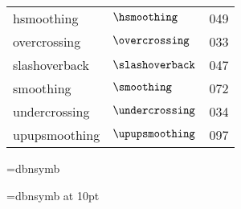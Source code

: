 \documentclass{article}
\begin{document}
\begin{tabular}{lll}
hsmoothing       &  $\hsmoothing   $    &  049\\
overcrossing     &  $\overcrossing $    &  033\\       
slashoverback    &  $\slashoverback$    &  047\\
smoothing        &  $\smoothing    $    &  072\\
undercrossing    &  $\undercrossing$    &  034\\
upupsmoothing    &  $\upupsmoothing$    &  097
\end{tabular}

\font\1=dbnsymb

{\1}\par

\font\2=dbnsymb at 10pt

{\2}\par
\end{document}
